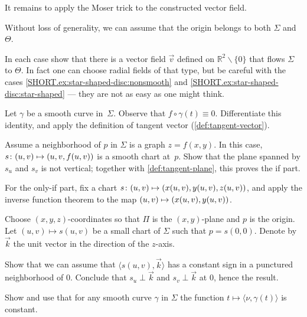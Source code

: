 \begin{multicols}{2}
It remains to apply the Moser trick to the constructed vector field. 

Without loss of generality, we can assume that the origin belongs to both $\Sigma$ and~$\Theta$.

In each case show that there is a vector field $\vec v$ defined on $\mathbb{R}^2\backslash\{0\}$ that flows $\Sigma$ to $\Theta$.
In fact one can choose radial fields of that type,
but be careful with the cases \ref{SHORT.ex:star-shaped-disc:nonsmooth} and \ref{SHORT.ex:star-shaped-disc:star-shaped} --- they are not as easy as one might think.


\setcounter{eqtn}{0}

Let $\gamma$ be a smooth curve in~$\Sigma$.
Observe that $f\circ\gamma(t)\equiv 0$.
Differentiate this identity, and apply the definition of tangent vector (\ref{def:tangent-vector}).

Assume a neighborhood of $p$ in $\Sigma$ is a graph $z=f(x,y)$.
In this case, $s\:(u,v)\z\mapsto (u,v,f(u,v))$ is a smooth chart at~$p$.
Show that the plane spanned by $s_u$ and $s_v$ is not vertical;
together with \ref{def:tangent-plane}, this proves the if part.

For the only-if part, fix a chart 
$s\:(u,v)\z\mapsto(x(u,v),y(u,v),z(u,v))$,
and apply the inverse function theorem to the map $(u,v)\z\mapsto(x(u,v),y(u,v))$.

Choose $(x,y,z)$-coordinates so that $\Pi$ is the $(x,y)$-plane and $p$ is the origin.
Let $(u,v)\mapsto s(u,v)$ be a small chart of $\Sigma$ such that $p=s(0,0)$.
Denote by $\vec k$ the unit vector in the direction of the $z$-axis.

Show that we can assume that $\langle s(u,v),\vec k\rangle$ has a constant sign in a punctured neighborhood of $0$.
Conclude that $s_u\perp \vec k$ and $s_v\perp \vec k$ at
$0$, hence the result.

Show and use that for any smooth curve $\gamma$ in $\Sigma$ the function $t\mapsto \langle\nu,\gamma(t)\rangle$ is constant.


\end{multicols}
